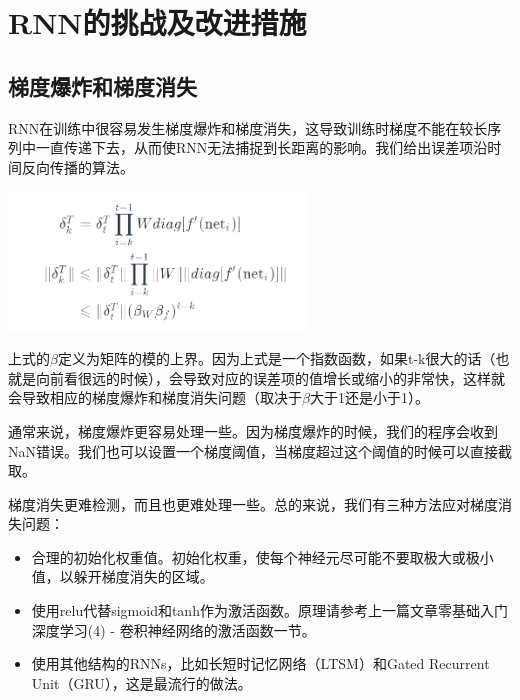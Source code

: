 \documentclass{article}
\begin{document}
\section{RNN的挑战及改进措施}
\subsection{梯度爆炸和梯度消失}
RNN在训练中很容易发生梯度爆炸和梯度消失，这导致训练时梯度不能在较长序列中一直传递下去，从而使RNN无法捕捉到长距离的影响。我们给出误差项沿时间反向传播的算法。\par 
\centerline{\includegraphics[width=8cm]{10}}
上式的$\beta$定义为矩阵的模的上界。因为上式是一个指数函数，如果t-k很大的话（也就是向前看很远的时候），会导致对应的误差项的值增长或缩小的非常快，这样就会导致相应的梯度爆炸和梯度消失问题（取决于$\beta$大于1还是小于1）。\par 
通常来说，梯度爆炸更容易处理一些。因为梯度爆炸的时候，我们的程序会收到NaN错误。我们也可以设置一个梯度阈值，当梯度超过这个阈值的时候可以直接截取。
\par 
梯度消失更难检测，而且也更难处理一些。总的来说，我们有三种方法应对梯度消失问题：
\begin{itemize}
	\item 合理的初始化权重值。初始化权重，使每个神经元尽可能不要取极大或极小值，以躲开梯度消失的区域。
	\item 使用relu代替sigmoid和tanh作为激活函数。原理请参考上一篇文章零基础入门深度学习(4) - 卷积神经网络的激活函数一节。
	\item 使用其他结构的RNNs，比如长短时记忆网络（LTSM）和Gated Recurrent Unit（GRU），这是最流行的做法。
\end{itemize}
 
\end{document}
